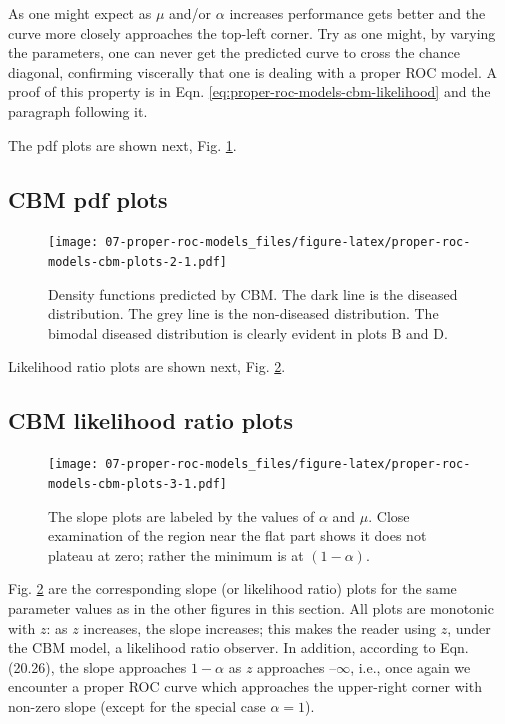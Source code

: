 \documentclass[
]{book}
\begin{document}
As one might expect as \(\mu\) and/or \(\alpha\) increases performance gets better and the curve more closely approaches the top-left corner. Try as one might, by varying the parameters, one can never get the predicted curve to cross the chance diagonal, confirming viscerally that one is dealing with a proper ROC model. A proof of this property is in Eqn. \eqref{eq:proper-roc-models-cbm-likelihood} and the paragraph following it.

The pdf plots are shown next, Fig. \ref{fig:proper-roc-models-cbm-plots-2}.

\hypertarget{proper-roc-models-cbm-pdfs}{%
\subsection{CBM pdf plots}\label{proper-roc-models-cbm-pdfs}}

\begin{figure}
\centering
\texttt{[image: 07-proper-roc-models\_files/figure-latex/proper-roc-models-cbm-plots-2-1.pdf]}
\caption{\label{fig:proper-roc-models-cbm-plots-2}Density functions predicted by CBM. The dark line is the diseased distribution. The grey line is the non-diseased distribution. The bimodal diseased distribution is clearly evident in plots B and D.}
\end{figure}

Likelihood ratio plots are shown next, Fig. \ref{fig:proper-roc-models-cbm-plots-3}.

\hypertarget{proper-roc-models-cbm-slopes}{%
\subsection{CBM likelihood ratio plots}\label{proper-roc-models-cbm-slopes}}

\begin{figure}
\centering
\texttt{[image: 07-proper-roc-models\_files/figure-latex/proper-roc-models-cbm-plots-3-1.pdf]}
\caption{\label{fig:proper-roc-models-cbm-plots-3}The slope plots are labeled by the values of \(\alpha\) and \(\mu\). Close examination of the region near the flat part shows it does not plateau at zero; rather the minimum is at \((1 - \alpha)\).}
\end{figure}

Fig. \ref{fig:proper-roc-models-cbm-plots-3} are the corresponding slope (or likelihood ratio) plots for the same parameter values as in the other figures in this section. All plots are monotonic with \(z\): as \(z\) increases, the slope increases; this makes the reader using \(z\), under the CBM model, a likelihood ratio observer. In addition, according to Eqn. (20.26), the slope approaches \(1-\alpha\) as \(z\) approaches \(–\infty\), i.e., once again we encounter a proper ROC curve which approaches the upper-right corner with non-zero slope (except for the special case \(\alpha = 1\)).
\end{document}
